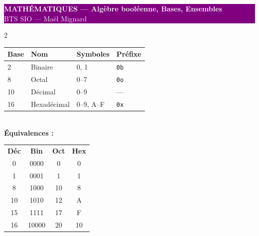 \documentclass[a4paper,10pt]{article}
\begin{document}
\begin{center}
  \colorbox{purple}{\parbox{\dimexpr\textwidth-2\fboxsep}{
    \centering\vspace{3pt}
    {\LARGE\bfseries\textcolor{white}{MATHÉMATIQUES — Algèbre booléenne, Bases, Ensembles}}\\
    {\normalsize\textcolor{white}{BTS SIO — Maël Mignard}}
    \vspace{3pt}
  }}
\end{center}
\vspace{6pt}

\begin{multicols}{2}

\begin{tcolorbox}[basebox, colframe=navy, title=1. Systèmes de numération]
\begin{tabular}{llll}
\toprule
\textbf{Base} & \textbf{Nom} & \textbf{Symboles} & \textbf{Préfixe} \\
\midrule
2  & Binaire      & 0, 1        & \texttt{0b} \\
8  & Octal        & 0--7        & \texttt{0o} \\
10 & Décimal      & 0--9        & — \\
16 & Hexadécimal  & 0--9, A--F  & \texttt{0x} \\
\bottomrule
\end{tabular}
\vspace{4pt}\\
\textbf{Équivalences :}
\begin{tabular}{cccc}
\textbf{Déc} & \textbf{Bin} & \textbf{Oct} & \textbf{Hex} \\
0  & 0000 & 0  & 0 \\
1  & 0001 & 1  & 1 \\
8  & 1000 & 10 & 8 \\
10 & 1010 & 12 & A \\
15 & 1111 & 17 & F \\
16 & 10000 & 20 & 10 \\
\end{tabular}
\end{tcolorbox}


\end{multicols}
\end{document}
